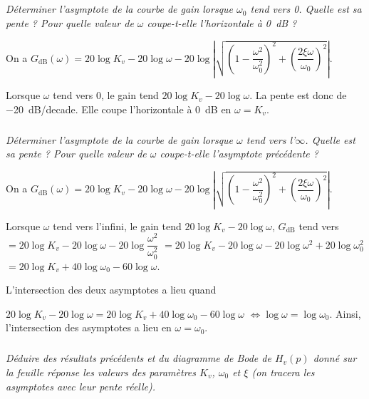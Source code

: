 \documentclass[10pt,fleqn]{article} %
\begin{document}
\begin{multicols}{2}
\subparagraph{}\textit{Déterminer l’asymptote de la courbe de gain lorsque 
$\omega_0$ tend vers 0. Quelle est sa pente ?
Pour quelle valeur de $\omega$ coupe-t-elle l’horizontale à \SI{0}{dB} ?}

\begin{corrige}
On a $G_{\text{dB}}\left(\omega \right)
=20\log K_v- 20\log  \omega - 20\log  \left| \sqrt{\left(1- \dfrac{\omega^2}{\omega_0^2} \right)^2+\left( \dfrac{2\xi\omega }{\omega_0} \right)^2} \right|$. 

Lorsque $\omega$ tend vers 0, le gain tend $20\log K_v- 20\log  \omega$.
 La pente est donc de \SI{-20}{dB/decade}. Elle coupe l'horizontale à \SI{0}{dB} en $\omega=K_v$.

\end{corrige}

\subparagraph{}\textit{Déterminer l’asymptote de la courbe de gain lorsque $\omega$ tend vers l'$\infty$. Quelle est sa pente ?	
Pour quelle valeur de $\omega$ coupe-t-elle l’asymptote précédente ?}


\begin{corrige}
On a $G_{\text{dB}}\left(\omega \right)
=20\log K_v- 20\log  \omega - 20\log  \left| \sqrt{\left(1- \dfrac{\omega^2}{\omega_0^2} \right)^2+\left( \dfrac{2\xi\omega }{\omega_0} \right)^2} \right|$. 

Lorsque $\omega$ tend vers l'infini, le gain tend $20\log K_v- 20\log  \omega$, 
$G_{\text{dB}}$ tend vers 
$= 20\log K_v- 20\log  \omega - 20\log  \dfrac{\omega^2}{\omega_0^2} $
$= 20\log K_v- 20\log  \omega - 20\log  \omega^2 +20\log  \omega_0^2 $
$= 20\log K_v+ 40\log  \omega_0 - 60\log  \omega $.

L'intersection des deux asymptotes a lieu quand 

$20\log K_v- 20\log  \omega= 20\log K_v+40\log  \omega_0 - 60\log  \omega$
$\Leftrightarrow \log  \omega= \log  \omega_0 $. Ainsi, l'intersection des asymptotes a lieu en $\omega=\omega_0$. 
\end{corrige}

\subparagraph{}\textit{Déduire des résultats précédents et du diagramme de Bode de $H_v(p)$ donné sur la feuille réponse les valeurs des paramètres $K_v$, $\omega_0$ et $\xi$ (on tracera les asymptotes avec leur pente réelle).}


\end{multicols}
\end{document}
